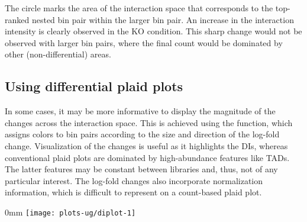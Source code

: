 \documentclass{report}\usepackage[]{graphicx}\usepackage[usenames,dvipsnames]{color}
\makeatletter
\def\maxwidth{ %
  \ifdim\Gin@nat@width>\linewidth
    \linewidth
  \else
    \Gin@nat@width
  \fi
}
\newcommand{\hlnum}[1]{\textcolor[rgb]{0.816,0.125,0.439}{#1}}%
\newcommand{\hlstr}[1]{\textcolor[rgb]{0.251,0.627,0.251}{#1}}%
\newcommand{\hlopt}[1]{\textcolor[rgb]{0,0,0}{#1}}%
\newcommand{\hlstd}[1]{\textcolor[rgb]{0.251,0.251,0.251}{#1}}%
\newcommand{\hlkwb}[1]{\textcolor[rgb]{0,0,0}{#1}}%
\newcommand{\hlkwc}[1]{\textcolor[rgb]{0.251,0.251,0.251}{#1}}%
\newcommand{\hlkwd}[1]{\textcolor[rgb]{0.878,0.439,0.125}{#1}}%
\newenvironment{knitrout}{}{} %
\makeatother
\begin{document}
The circle marks the area of the interaction space that corresponds to the top-ranked nested bin pair within the  larger bin pair.
An increase in the interaction intensity is clearly observed in the KO condition.
This sharp change would not be observed with larger bin pairs, where the final count would be dominated by other (non-differential) areas.

\subsection{Using differential plaid plots}
In some cases, it may be more informative to display the magnitude of the changes across the interaction space.
This is achieved using the  function, which assigns colors to bin pairs according to the size and direction of the log-fold change.
Visualization of the changes is useful as it highlights the DIs, whereas conventional plaid plots are dominated by high-abundance features like TADs.
The latter features may be constant between libraries and, thus, not of any particular interest.
The log-fold changes also incorporate normalization information, which is difficult to represent on a count-based plaid plot.

\begin{knitrout}
\color{fgcolor}\begin{adjustwidth}{\fltoffset}{0mm}
\texttt{[image: plots-ug/diplot-1]} \end{adjustwidth}
\end{knitrout}
\end{document}
